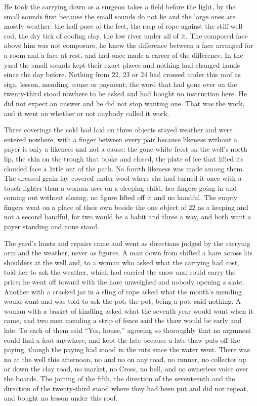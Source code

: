 He took the carrying down as a surgeon takes a field before the light, by the small sounds first because the small sounds do not lie and the large ones are mostly weather: the half-pace of the feet, the rasp of rope against the stiff well-rod, the dry tick of cooling clay, the low river under all of it. The composed face above him was not composure; he knew the difference between a face arranged for a room and a face at rest, and had once made a career of the difference. In the yard the small sounds kept their exact places and nothing had changed hands since the day before. Nothing from  22, 23 or 24 had crossed under this roof as sign, lesson, mending, cause or payment; the word that had gone over  on the twenty-third stood nowhere to be asked and had bought no instruction here. He did not expect an answer and he did not stop wanting one. That was the work, and it went on whether or not anybody called it work.

Three coverings the cold had laid on three objects stayed weather and were entered nowhere, with a finger between every pair because likeness without a payer is only a likeness and not a cause: the gone white frost on the well's north lip, the skin on the trough that broke and closed, the plate of ice that lifted its clouded face a little out of the path. No fourth likeness was made among them. The dressed grain lay covered under wool where she had turned it once with a touch lighter than a woman uses on a sleeping child, her fingers going in and coming out without closing, no figure lifted off it and no handful. The empty fingers went on a place of their own beside the one object of  22 as a keeping and not a second handful, for two would be a habit and three a way, and both want a payer standing and none stood.

The yard's hunts and repairs came and went as directions judged by the carrying arm and the weather, never as figures. A man down from  shifted a hare across his shoulders at the well and, to a woman who asked what the carrying had cost, told her to ask the weather, which had carried the snow and could carry the price; he went off toward  with the hare unweighed and nobody opening a slate. Another with a cracked jar in a sling of rope asked what the month's mending would want and was told to ask the pot; the pot, being a pot, said nothing. A woman with a basket of kindling asked what the seventh year would want when it came, and two men mending a strip of fence said the thaw would be early and late. To each of them  said “Yes, house,” agreeing so thoroughly that no argument could find a foot anywhere, and kept the late because a late thaw puts off the paying, though the paying had stood in the ruts since the water went. There was no  at the well this afternoon, no  and no  on any road, no runner, no collector up or down the clay road, no market, no Cross, no bell, and no ownerless voice over the boards. The joining of the fifth, the direction of the seventeenth and the direction of the twenty-third stood where they had been put and did not repeat, and bought no lesson under this roof.

